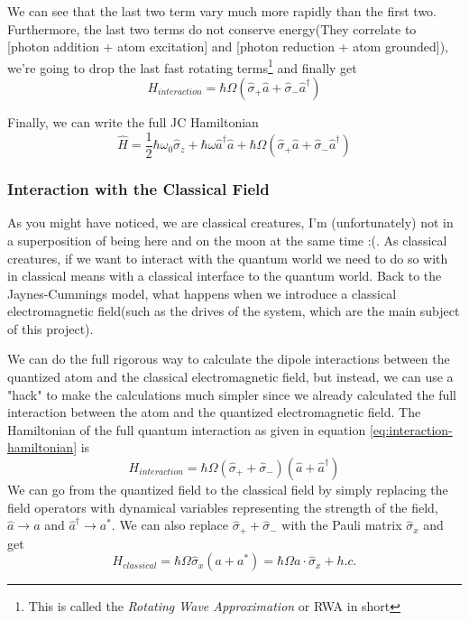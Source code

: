 \documentclass[english, a4paper, 12pt, twoside]{article}
\numberwithin{equation}{section} %
\begin{document}
We can see that the last two term vary much more rapidly than the first two. Furthermore, the last two terms do not conserve energy(They correlate to [photon addition + atom excitation] and [photon reduction + atom grounded]), we're going to drop the last fast rotating terms\footnote{This is called the \textit{Rotating Wave Approximation} or RWA in short} and finally get
\begin{equation} \label{eq:interaction-hamiltonian-RWA}
    \boxed{H_{interaction} = \hbar\Omega(\hat{\sigma}_+\hat{a} + \hat{\sigma}_-\hat{a}^\dag)}
\end{equation}

\par

Finally, we can write the full JC Hamiltonian
\begin{equation} \label{eq:JC-hamiltonian}
    \boxed{\hat{H} = \frac{1}{2}\hbar \omega_0\hat{\sigma}_z 
                     + \hbar \omega \hat{a}^\dag \hat{a} 
                     +  \hbar\Omega(\hat{\sigma}_+\hat{a} + \hat{\sigma}_-\hat{a}^\dag)}
\end{equation}


\subsubsection{Interaction with the Classical Field} \label{sec:interaction-with_classical-field}
As you might have noticed, we are classical creatures, I'm (unfortunately) not in a superposition of being here and on the moon at the same time :(. As classical creatures, if we want to interact with the quantum world we need to do so with in classical means with a classical interface to the quantum world. Back to the Jaynes-Cummings model, what happens when we introduce a classical electromagnetic field(such as the drives of the system, which are the main subject of this project).

We can do the full rigorous way to calculate the dipole interactions between the quantized atom and the classical electromagnetic field, but instead, we can use a "hack" to make the calculations much simpler since we already calculated the full interaction between the atom and the quantized electromagnetic field. The Hamiltonian of the full quantum interaction as given in equation \ref{eq:interaction-hamiltonian} is
\[
    H_{interaction} = \hbar \Omega (\hat{\sigma}_+ + \hat{\sigma}_-)(\hat{a} + \hat{a}^\dag)
\]
We can go from the quantized field to the classical field by simply replacing the field operators with dynamical variables representing the strength of the field, $\hat{a} \rightarrow a$ and $\hat{a}^\dag \rightarrow a^*$. We can also replace $\hat{\sigma}_+ + \hat{\sigma}_-$ with the Pauli matrix $\hat{\sigma}_x$ and get
\begin{equation}\label{eq:atom-field-class-int}
    H_{classical} = \hbar \Omega \hat{\sigma}_x(a + a^*) = \hbar \Omega a \cdot \hat{\sigma}_x + h.c.
\end{equation}
\end{document}
